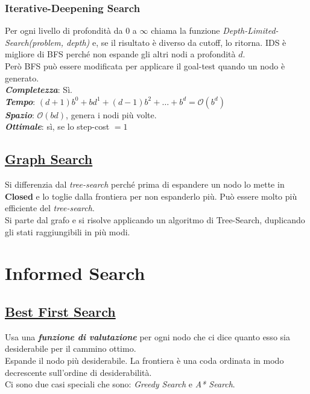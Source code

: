 \documentclass[a4paper, notitlepage, 9pt]{extreport}
\begin{document}
\subsection*{Iterative-Deepening Search}
Per ogni livello di profondità da $0$ a $\infty$ chiama la funzione \textit{Depth-Limited-Search(problem, depth)} e, se il risultato è diverso da cutoff, lo ritorna. IDS è migliore di BFS perché non espande gli altri nodi a profondità $d$.\\
Però BFS può essere modificata per applicare il goal-test quando un nodo è generato.\\
\textit{\textbf{Completezza}}: Sì.\\
\textit{\textbf{Tempo}}: $(d+1)b^0 + bd^1 + (d-1)b^2 + \dots + b^d = \mathcal{O}(b^d)$\\
\textit{\textbf{Spazio}}: $\mathcal{O}(bd)$, genera i nodi più volte.\\
\textit{\textbf{Ottimale}}: sì, se lo step-cost $= 1$


\section*{\underline{Graph Search}}
Si differenzia dal \textit{tree-search} perché prima di espandere un nodo lo mette in \textbf{Closed} e lo toglie dalla frontiera per non espanderlo più. Può essere molto più efficiente del \textit{tree-search}.\\
Si parte dal grafo e si risolve applicando un algoritmo di Tree-Search, duplicando gli stati raggiungibili in più modi.



\chapter*{Informed Search}


\section*{\underline{Best First Search}}
Usa una \textit{\textbf{funzione di valutazione}} per ogni nodo che ci dice quanto esso sia desiderabile per il cammino ottimo.\\
Espande il nodo più desiderabile. La frontiera è una coda ordinata in modo decrescente sull'ordine di desiderabilità.\\
Ci sono due casi speciali che sono: \textit{Greedy Search} e \textit{A* Search}.
\end{document}

